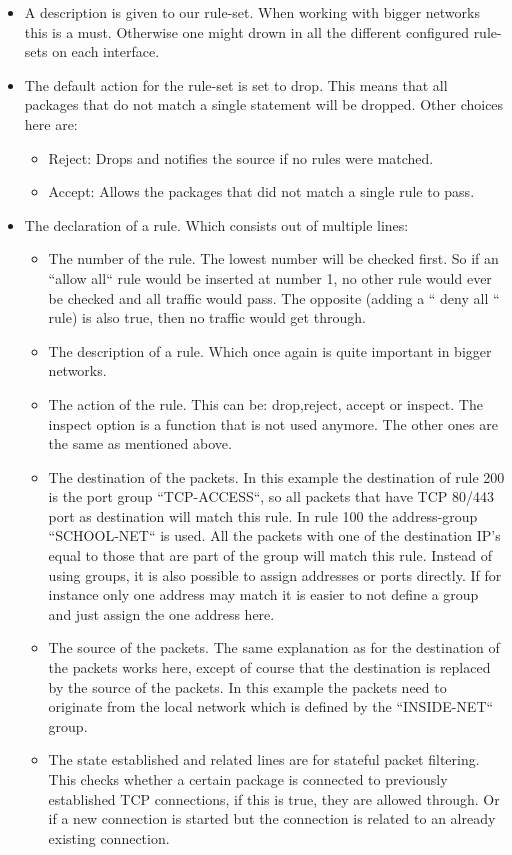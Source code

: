 \begin{itemize}
\item A description is given to our rule-set. When working with bigger networks this is a must. Otherwise one might drown in all the different configured rule-sets on each interface.
\item The default action for the rule-set is set to drop. This means that all packages that do not match a single statement will be dropped. Other choices here are:
\begin{itemize}
\item Reject: Drops and notifies the source if no rules were matched.
\item Accept: Allows the packages that did not match a single rule to pass.
\end{itemize}
\item The declaration of a rule. Which consists out of multiple lines:
\begin{itemize}
\item The number of the rule. The lowest number will be checked first. So if an ``allow all`` rule would be inserted at number 1, no other rule would ever be checked and all traffic would pass. The opposite (adding a `` deny all `` rule) is also true, then no traffic would get through.
\item The description of a rule. Which once again is quite important in bigger networks.
\item The action of the rule. This can be: drop,reject, accept or inspect. The inspect option is a function that is not used anymore. The other ones are the same as mentioned above.
\item The destination of the packets. In this example the destination of rule 200 is the port group ``TCP-ACCESS``, so all packets that have TCP 80/443 port as destination will match this rule. In rule 100 the address-group ``SCHOOL-NET`` is used. All the packets with one of the  destination IP's equal to those that are part of the group will match this rule. Instead of using groups, it is also possible to assign addresses or ports directly. If for instance only one address may match it is easier to not define a group and just assign the one address here.
\item The source of the packets. The same explanation as for the destination of the packets works here, except of course that the destination is replaced by the source of the packets. In this example the packets need to originate from the local network which is defined by the ``INSIDE-NET`` group.
\item The state established and related lines are for stateful packet filtering. This checks whether a certain package is connected to previously established TCP connections, if this is true, they are allowed through. Or if a new connection is started but the connection is related to an already existing connection.
\end{itemize}
\end{itemize}
